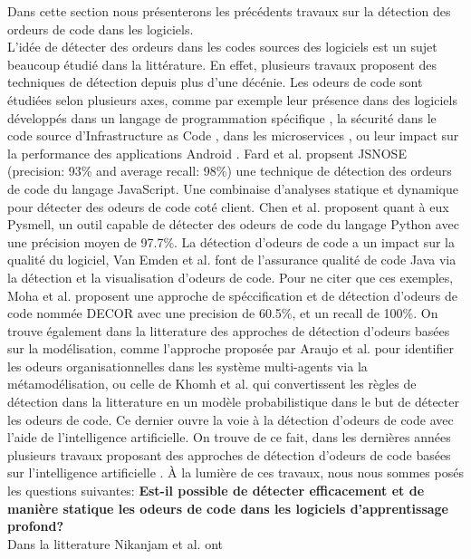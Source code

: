 \label{sec:background}
Dans cette section nous présenterons les précédents travaux sur la détection des
ordeurs de code dans les logiciels.\\

L'idée de détecter des ordeurs dans les codes sources des logiciels est un
sujet beaucoup étudié dans la littérature. En effet, plusieurs travaux proposent
des techniques de détection depuis plus d'une décénie. Les odeurs de code sont
étudiées selon plusieurs axes, comme par exemple leur présence dans des
logiciels développés dans un langage de programmation spécifique
\cite{saboury2017empirical}, la sécurité dans le code source d'Infrastructure as Code
\cite{rahman2021security}, dans les microservices \cite{cernymicroservice}, ou
leur impact sur la performance des applications Android
\cite{hecht2016empirical}.
Fard et al. \cite{6648192} propsent JSNOSE (precision: 93\% and average recall: 98\%) une technique de détection des
ordeurs de code du langage JavaScript. Une combinaise d'analyses statique et
dynamique pour détecter des odeurs de code coté client. Chen et al.
\cite{chen2016detecting} proposent quant à eux Pysmell, un outil capable de
détecter des odeurs de code du langage Python avec une précision moyen de
97.7\%. La détection d'odeurs de code a un impact sur la qualité du logiciel,
Van Emden et al. \cite{1173068} font de l'assurance qualité de code Java via la
détection et la visualisation d'odeurs de code. Pour ne citer que ces exemples,
Moha et al. \cite{moha2010decor} proposent une approche de spéccification et de
détection d'odeurs de code nommée DECOR avec une precision de 60.5\%,
et un recall de 100\%. On trouve également dans la litterature des approches de
détection d'odeurs basées sur la modélisation, comme l'approche proposée par
Araujo et al. \cite{araujo2018metamodeling} pour identifier les odeurs
organisationnelles dans les système multi-agents via la métamodélisation, ou
celle de Khomh et al. \cite{khomh2009bayesian} qui convertissent les règles de
détection dans la litterature en un modèle probabilistique dans le but de
détecter les odeurs de code. Ce dernier ouvre la voie à la détection d'odeurs
de code avec
l'aide de l'intelligence artificielle. On trouve de ce fait, dans les dernières
années plusieurs travaux proposant des approches de détection d'odeurs de code
basées sur l'intelligence artificielle \cite{alawadi2023fedcsd,
    sandouka2023python, alazba2023deep}. À la lumière de ces travaux, nous nous
sommes posés les questions suivantes: \textbf{Est-il possible de détecter
    efficacement et de
    manière statique les
    odeurs de code dans les logiciels d'apprentissage profond?} \\ Dans la litterature Nikanjam et al. ont
